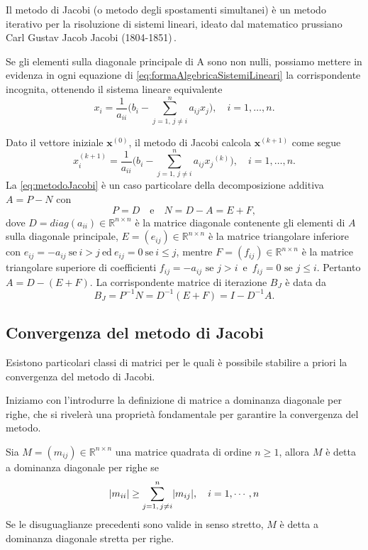 Il metodo di Jacobi (o metodo degli spostamenti simultanei) \`e un metodo iterativo per la risoluzione di sistemi lineari, ideato dal matematico prussiano Carl Gustav Jacob Jacobi (1804-1851)\,\cite{JacobiMethod}.

Se gli elementi sulla diagonale principale di A sono non nulli, possiamo mettere in evidenza in ogni equazione di
\eqref{eq:formaAlgebricaSistemiLineari} la corrispondente incognita, ottenendo il sistema lineare equivalente
\begin{equation}
    x_{i}=\frac{1}{a_{ii}}\Bigg(b_{i} - \sum_{j=1, \, j \neq i}^{n}a_{ij}x_{j}\Bigg),\quad i=1,\dots,n.
\end{equation}

Dato il vettore iniziale $\mathbf{x}^{(0)}$, il metodo di Jacobi calcola $\mathbf{x}^{(k+1)}$ come segue
\begin{equation}
    \label{eq:metodoJacobi}
    x_{i}^{(k+1)}=\frac{1}{a_{ii}}\Bigg(b_{i} - \sum_{j=1, \, j \neq i}^{n}a_{ij}x{_j}^{(k)}\Bigg),\quad i=1,\dots,n.
\end{equation}
La \eqref{eq:metodoJacobi} \`e un caso particolare della decomposizione additiva $A = P-N$ con
\begin{equation*}
    P = D\quad \text{e}\quad N = D - A = E + F,
\end{equation*}
dove $D=diag(a_{ii})\in\mathbb{R}^{n\times n}$ \`e la matrice diagonale contenente gli elementi di $A$ sulla diagonale principale,
$E=(e_{ij})\in\mathbb{R}^{n\times n}$ \`e la matrice triangolare inferiore con \mbox{$e_{ij}=-a_{ij} \ \text{se} \ i>j \ \text{ed}\ e_{ij}=0 \ \text{se} \ i\le j$},
mentre $F=(f_{ij})\in\mathbb{R}^{n\times n}$ \`e la matrice triangolare superiore di coefficienti \mbox{$f_{ij}=-a_{ij} \text{ se } j>i$ e $f_{ij}=0 \text{ se } j\le i$}.\newline
Pertanto $A = D - (E + F)$.\newline
La corrispondente matrice di iterazione $B_{J}$ \`e data da
\begin{equation}
    B_{J} = P^{-1}N = D^{-1}(E + F) = I - D^{-1}A.
\end{equation}
\subsection{Convergenza del metodo di Jacobi}
Esistono particolari classi di matrici per le quali \`e possibile stabilire a priori la convergenza del metodo di Jacobi.

Iniziamo con l'introdurre la definizione di matrice a dominanza diagonale per righe, che si riveler\`a una propriet\`a fondamentale per garantire la convergenza del metodo.
\begin{definizione}
    Sia $M = (m_{ij})\in\mathbb{R}^{n \times n}$ una matrice quadrata di ordine $n\ge 1$, allora $M$ \`e detta a dominanza diagonale per righe se
    \[
        \lvert m_{ii}\rvert \ge \sum_{j=1,\, j \neq i}^{n}\lvert m_{ij}\rvert,\quad i = 1,\cdots,n
    \]
    Se le disuguaglianze precedenti sono valide in senso stretto, $M$ \`e detta a dominanza diagonale stretta per righe.
\end{definizione}

